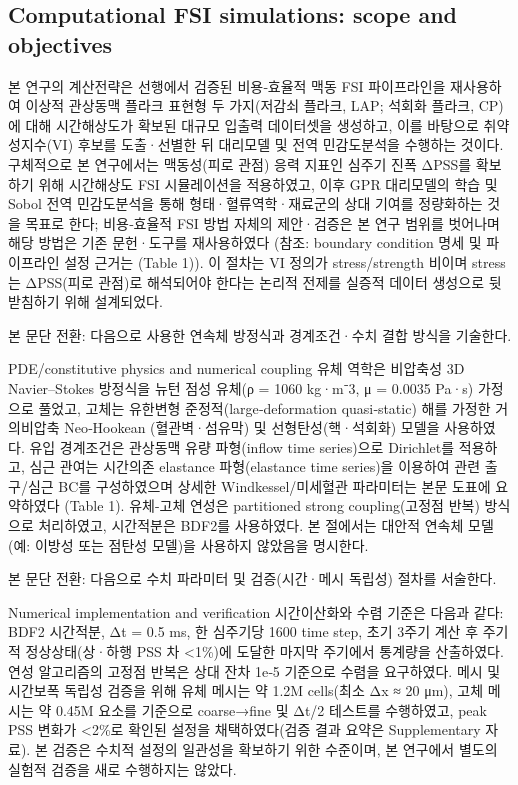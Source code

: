 \documentclass[preprint,12pt]{elsarticle}
\begin{document}
\subsection{Computational FSI simulations: scope and objectives}
본 연구의 계산전략은 선행에서 검증된 비용‑효율적 맥동 FSI 파이프라인을 재사용하여 이상적 관상동맥 플라크 표현형 두 가지(저감쇠 플라크, LAP; 석회화 플라크, CP)에 대해 시간해상도가 확보된 대규모 입출력 데이터셋을 생성하고, 이를 바탕으로 취약성지수(VI) 후보를 도출·선별한 뒤 대리모델 및 전역 민감도분석을 수행하는 것이다. 구체적으로 본 연구에서는 맥동성(피로 관점) 응력 지표인 심주기 진폭 ΔPSS를 확보하기 위해 시간해상도 FSI 시뮬레이션을 적용하였고, 이후 GPR 대리모델의 학습 및 Sobol 전역 민감도분석을 통해 형태·혈류역학·재료군의 상대 기여를 정량화하는 것을 목표로 한다; 비용‑효율적 FSI 방법 자체의 제안·검증은 본 연구 범위를 벗어나며 해당 방법은 기존 문헌·도구를 재사용하였다 (참조: boundary condition 명세 및 파이프라인 설정 근거는 (Table 1)). 이 절차는 VI 정의가 stress/strength 비이며 stress는 ΔPSS(피로 관점)로 해석되어야 한다는 논리적 전제를 실증적 데이터 생성으로 뒷받침하기 위해 설계되었다. \cite{claireconway2014}

본 문단 전환: 다음으로 사용한 연속체 방정식과 경계조건·수치 결합 방식을 기술한다.

PDE/constitutive physics and numerical coupling
유체 역학은 비압축성 3D Navier–Stokes 방정식을 뉴턴 점성 유체(ρ = 1060 kg·m⁻3, μ = 0.0035 Pa·s) 가정으로 풀었고, 고체는 유한변형 준정적(large‑deformation quasi‑static) 해를 가정한 거의비압축 Neo‑Hookean (혈관벽·섬유막) 및 선형탄성(핵·석회화) 모델을 사용하였다. 유입 경계조건은 관상동맥 유량 파형(inflow time series)으로 Dirichlet를 적용하고, 심근 관여는 시간의존 elastance 파형(elastance time series)을 이용하여 관련 출구/심근 BC를 구성하였으며 상세한 Windkessel/미세혈관 파라미터는 본문 도표에 요약하였다 (Table 1). 유체-고체 연성은 partitioned strong coupling(고정점 반복) 방식으로 처리하였고, 시간적분은 BDF2를 사용하였다. 본 절에서는 대안적 연속체 모델(예: 이방성 또는 점탄성 모델)을 사용하지 않았음을 명시한다.

본 문단 전환: 다음으로 수치 파라미터 및 검증(시간·메시 독립성) 절차를 서술한다.

Numerical implementation and verification
시간이산화와 수렴 기준은 다음과 같다: BDF2 시간적분, Δt = 0.5 ms, 한 심주기당 1600 time step, 초기 3주기 계산 후 주기적 정상상태(상·하행 PSS 차 <1\%)에 도달한 마지막 주기에서 통계량을 산출하였다. 연성 알고리즘의 고정점 반복은 상대 잔차 1e‑5 기준으로 수렴을 요구하였다. 메시 및 시간보폭 독립성 검증을 위해 유체 메시는 약 1.2M cells(최소 Δx ≈ 20 μm), 고체 메시는 약 0.45M 요소를 기준으로 coarse→fine 및 Δt/2 테스트를 수행하였고, peak PSS 변화가 <2\%로 확인된 설정을 채택하였다(검증 결과 요약은 Supplementary 자료). 본 검증은 수치적 설정의 일관성을 확보하기 위한 수준이며, 본 연구에서 별도의 실험적 검증을 새로 수행하지는 않았다.
\end{document}
